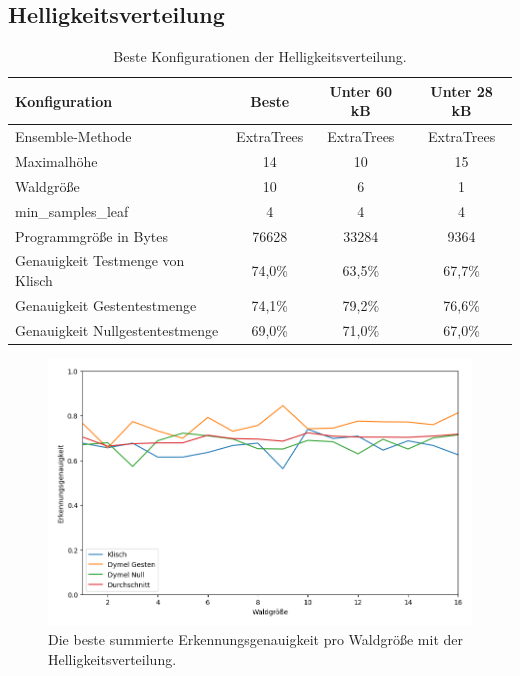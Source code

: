 \subsection{Helligkeitsverteilung}
\begin{table}[h!]
    \centering
    \begin{tabular}{ | l | c | c | c |}
        \hline
        Konfiguration & Beste & Unter 60 kB & Unter 28 kB \\\hline
        Ensemble-Methode & ExtraTrees & ExtraTrees & ExtraTrees \\\hline
        Maximalhöhe & 14 & 10 & 15 \\\hline
        Waldgröße & 10 & 6 & 1 \\\hline
        min\_samples\_leaf & 4 & 4 & 4 \\\hline
        Programmgröße in Bytes & 76628 & 33284 & 9364 \\\hline
        Genauigkeit Testmenge von Klisch & 74,0\% & 63,5\% & 67,7\% \\\hline
        Genauigkeit Gestentestmenge & 74,1\% & 79,2\% & 76,6\% \\\hline
        Genauigkeit Nullgestentestmenge & 69,0\% & 71,0\% & 67,0\% \\\hline
    \end{tabular}
    \caption{Beste Konfigurationen der Helligkeitsverteilung.}
    \label{tab:helligkeitsverteilung}
\end{table}
\begin{figure}[h!]
    \centering
    \includegraphics[width=\linewidth]{images/helligkeitsverteilung_acc_per_size.png}
    \caption{Die beste summierte Erkennungsgenauigkeit pro Waldgröße mit der Helligkeitsverteilung.}
    \label{fig:helligkeitsverteilung_per_forest_size}
\end{figure}
